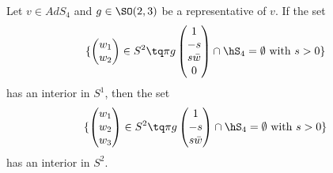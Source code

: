 \begin{lemma}		\label{LemOouversttq}
	Let $v\in AdS_4$ and $g\in \SO(2,3)$ be a representative of $v$. If the set
	\begin{equation}
		\{ \begin{pmatrix}
			w_1	\\ 
			w_2	
		\end{pmatrix}\in S^2\tq
		\pi g\begin{pmatrix}
			1	\\ 
			-s	\\ 
			s\bar w	\\ 
			0	
		\end{pmatrix}\cap\hS_4=\emptyset\text{ with $s>0$}
				\}
	\end{equation}
	has an interior in $S^1$, then the set
	\begin{equation}
		\{ 
		\begin{pmatrix}
			w_1	\\ 
			w_2	\\ 
			w_3	
		\end{pmatrix}\in S^2\tq
		\pi g\begin{pmatrix}
			1	\\ 
			-s	\\ 
			s\bar w		
		\end{pmatrix}\cap\hS_4=\emptyset\text{ with $s>0$}
		\}
	\end{equation}
	has an interior in $S^2$.
\end{lemma}

